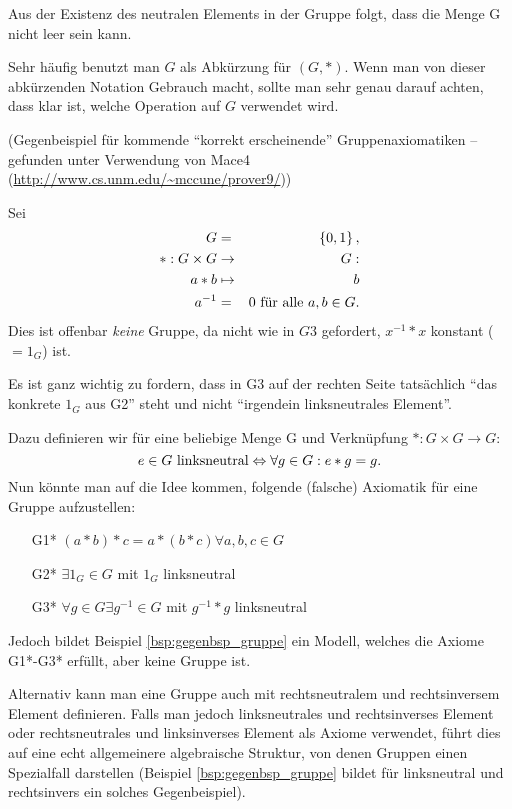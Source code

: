 \documentclass[10pt]{scrbook}
\begin{document}
\begin{Bem}
Aus der Existenz des neutralen Elements in der Gruppe folgt, dass die Menge G nicht leer sein kann.
\end{Bem}

\begin{Bem}
Sehr häufig benutzt man $G$ als Abkürzung für $(G, *)$. Wenn man von dieser abkürzenden Notation Gebrauch macht, sollte man sehr genau darauf achten, dass klar ist, welche Operation auf $G$ verwendet wird.
\end{Bem}

\begin{Bsp}
\label{bsp:gegenbsp_gruppe}
(Gegenbeispiel für kommende "`korrekt erscheinende"' Gruppenaxiomatiken -- gefunden unter Verwendung von Mace4 (\url{http://www.cs.unm.edu/~mccune/prover9/}))

Sei
\begin{eqnarray*}
G & = & \left\{0, 1\right\}, \\
*: G\times G & \rightarrow & G: \\
a*b & \mapsto & b \\
a^{-1} & = & 0 \textnormal{ für alle }a, b\in G.
\end{eqnarray*}
Dies ist offenbar \emph{keine} Gruppe, da nicht wie in $G3$ gefordert, $x^{-1}*x$ konstant ($=1_G$) ist.
\end{Bsp}

\begin{Bem}
Es ist ganz wichtig zu fordern, dass in G3 auf der rechten Seite tatsächlich "`das konkrete $1_G$ aus G2"' steht und nicht "`irgendein linksneutrales Element"'.

Dazu definieren wir für eine beliebige Menge G und Verknüpfung $*:G\times G\rightarrow G$:
\begin{displaymath}
e\in G\textnormal{ linksneutral}\Leftrightarrow \forall g\in G: e*g=g.
\end{displaymath}
Nun könnte man auf die Idee kommen, folgende (falsche) Axiomatik für eine Gruppe aufzustellen:
\begin{enumerate}
	\item[G1*] $(a*b)*c=a*(b*c)\forall a, b, c\in G$
	\item[G2*] $\exists 1_G\in G$ mit $1_G$ linksneutral
	\item[G3*] $\forall g\in G\exists g^{-1}\in G$ mit $g^{-1}*g$ linksneutral
\end{enumerate}
Jedoch bildet Beispiel \ref{bsp:gegenbsp_gruppe} ein Modell, welches die Axiome G1*-G3* erfüllt, aber keine Gruppe ist.
\end{Bem}
\begin{Bem}
Alternativ kann man eine Gruppe auch mit rechtsneutralem und rechtsinversem Element definieren. Falls man jedoch linksneutrales und rechtsinverses Element oder rechtsneutrales und linksinverses Element als Axiome verwendet, führt dies auf eine echt allgemeinere algebraische Struktur, von denen Gruppen einen Spezialfall darstellen (Beispiel \ref{bsp:gegenbsp_gruppe} bildet für linksneutral und rechtsinvers ein solches Gegenbeispiel).
\end{Bem}
\end{document}
